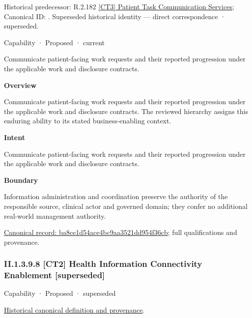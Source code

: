 {\small Historical predecessor: R.2.182 \hyperref[element:0914f2bb267449e282e9ae0f7407d9fe]{[CT3] Patient Task Communication Services}; Canonical ID: \texttt{}. Superseded historical identity — direct correspondence · superseded.}\par
\label{element:ba8ce1d54ace4bc9aa3521dd954f36cb}
{\small Capability · Proposed · current}\par

Communicate patient-facing work requests and their reported progression under the applicable work and disclosure contracts.



\textbf{Overview}



Communicate patient-facing work requests and their reported progression under the applicable work and disclosure contracts. The reviewed hierarchy assigns this enduring ability to its stated business-enabling context.



\textbf{Intent}



Communicate patient-facing work requests and their reported progression under the applicable work and disclosure contracts.



\textbf{Boundary}



Information administration and coordination preserve the authority of the responsible source, clinical actor and governed domain; they confer no additional real-world management authority.


{\footnotesize \href{../../../../continuum/strategy/capability/ba8ce1d54ace4bc9aa3521dd954f36cb.md}{Canonical record: ba8ce1d54ace4bc9aa3521dd954f36cb}; full qualifications and provenance.}\par
\subsubsection*{II.1.3.9.8 [CT2] Health Information Connectivity Enablement [superseded]}
\label{navigation:II.1.3.9.8}

\label{element:6a1030483dfc4ae6af6998b587129d1c}
{\small Capability · Proposed · superseded}\par
\href{../../../../continuum/strategy/capability/6a1030483dfc4ae6af6998b587129d1c.md}{Historical canonical definition and provenance}.\par
